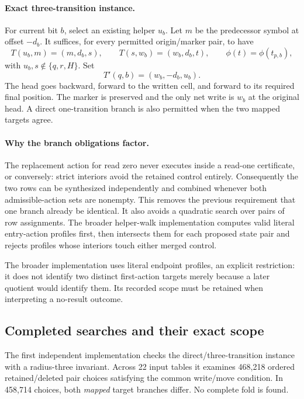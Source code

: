 \paragraph{Exact three-transition instance.}
For current bit $b$, select an existing helper $u_b$. Let $m$ be the predecessor symbol at offset $-d_b$. It suffices, for every permitted origin/marker pair, to have
\[
 T(u_b,m)=(m,d_b,s),\qquad
 T(s,w_b)=(w_b,d_b,t),\qquad
 \phi(t)=\phi(t_{p,b}),
\]
with $u_b,s\notin\{q,r,H\}$. Set
\[
 T'(q,b)=(w_b,-d_b,u_b).
\]
The head goes backward, forward to the written cell, and forward to its required final position. The marker is preserved and the only net write is $w_b$ at the original head. A direct one-transition branch is also permitted when the two mapped targets agree.

\paragraph{Why the branch obligations factor.}
The replacement action for read zero never executes inside a read-one certificate, or conversely: strict interiors avoid the retained control entirely. Consequently the two rows can be synthesized independently and combined whenever both admissible-action sets are nonempty. This removes the previous requirement that one branch already be identical. It also avoids a quadratic search over pairs of row assignments. The broader helper-walk implementation computes valid literal entry-action profiles first, then intersects them for each proposed state pair and rejects profiles whose interiors touch either merged control.

The broader implementation uses literal endpoint profiles, an explicit restriction: it does not identify two distinct first-action targets merely because a later quotient would identify them. Its recorded scope must be retained when interpreting a no-result outcome.

\subsection{Completed searches and their exact scope}

The first independent implementation checks the direct/three-transition instance with a radius-three invariant. Across 22 input tables it examines 468,218 ordered retained/deleted pair choices satisfying the common write/move condition. In 458,714 choices, both \emph{mapped} target branches differ. No complete fold is found.

